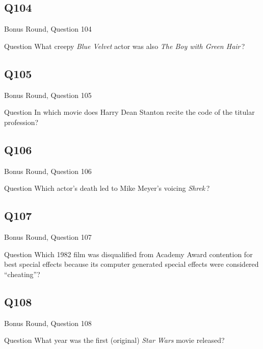 \documentclass[11pt]{beamer}
\begin{document}
\subsection*{Q104}
\begin{frame}[t]{Bonus Round, Question 104}
\vspace{2em}
\begin{block}{Question}
What creepy \emph{Blue Velvet} actor was also \emph{The Boy with Green Hair}\,?
\end{block}
\end{frame}
    

\subsection*{Q105}
\begin{frame}[t]{Bonus Round, Question 105}
\vspace{2em}
\begin{block}{Question}
In which movie does Harry Dean Stanton recite the code of the titular profession?
\end{block}
\end{frame}
    

\subsection*{Q106}
\begin{frame}[t]{Bonus Round, Question 106}
\vspace{2em}
\begin{block}{Question}
Which actor's death led to Mike Meyer's voicing \emph{Shrek}\,?
\end{block}
\end{frame}
    

\subsection*{Q107}
\begin{frame}[t]{Bonus Round, Question 107}
\vspace{2em}
\begin{block}{Question}
Which 1982 film was disqualified from Academy Award contention for best special effects because its computer generated special effects were considered ``cheating''?
\end{block}
\end{frame}
    

\subsection*{Q108}
\begin{frame}[t]{Bonus Round, Question 108}
\vspace{2em}
\begin{block}{Question}
What year was the first (original) \emph{Star Wars} movie released?
\end{block}
\end{frame}
    
\end{document}
